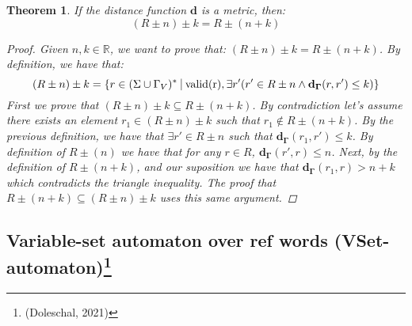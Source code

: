 \documentclass{article}
\newcommand{\set}[1]{\left\{#1\right\}}
\newcommand{\st}{\ \vline \ }
\newtheorem{theorem}{Theorem}
\begin{document}
\newpage
\begin{theorem}
    If the distance function $\mathbf{d}$ is a metric, then:
    \begin{equation}
        (R\pm n) \pm k = R\pm(n + k)
    \end{equation}
    \begin{proof}
        Given $n, k \in \mathbb{R}$, we want to prove that: $(R\pm n )\pm k = R \pm (n + k)$.
        By definition, we have that:
        \begin{equation*}
            (R \pm n) \pm k = \set{r \in (\Sigma \cup \Gamma_V)^* \st  \mathrm{valid(r)}, \exists r' (r'\in R \pm n \land \mathbf{d_\Gamma}(r, r') \leq k)}
        \end{equation*}
        First we prove that $(R \pm n) \pm k \subseteq R \pm (n + k)$. By contradiction let's assume there exists an element $r_1 \in (R \pm n) \pm k$ such that $r_1 \notin R\pm (n + k)$. By the previous definition, we have that $\exists r' \in R\pm n$ such that $\mathbf{d_\Gamma}(r_1, r') \leq k$. By definition of $R \pm (n)$ we have that for any $r \in R$, $\mathbf{d_\Gamma}(r', r) \leq n$. Next, by the definition of $R \pm (n + k)$, and our suposition we have that $\mathbf{d_\Gamma}(r_1, r) > n + k$ which contradicts the triangle inequality. The proof that $R \pm (n + k) \subseteq (R \pm n) \pm k$ uses this same argument.

    \end{proof}
\end{theorem}




\subsection*{Variable-set automaton over ref words (VSet-automaton)\footnote{(Doleschal, 2021)}}
\end{document}

